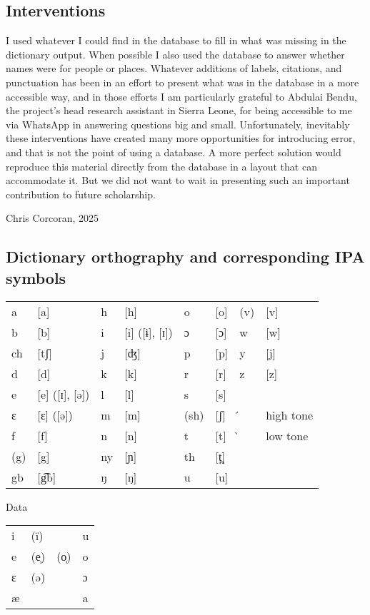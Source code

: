 \subsection{Interventions}
I used whatever I could find in the database to fill in what was missing in the dictionary output. When possible I also used the database to answer whether names were for people or places. Whatever additions of labels, citations, and punctuation has been in an effort to present what was in the database in a more accessible way, and in those efforts I am particularly grateful to Abdulai Bendu, the project’s head research assistant in Sierra Leone, for being accessible to me via WhatsApp in answering questions big and small. Unfortunately, inevitably these interventions have created many more opportunities for introducing error, and that is not the point of using a database. A more perfect solution would reproduce this material directly from the database in a layout that can accommodate it. But we did not want to wait in presenting such an important contribution to future scholarship.  




\begin{flushright}
    Chris Corcoran, 2025
\end{flushright}




\subsection{Dictionary orthography and corresponding IPA symbols}

\begin{tabularx}{\textwidth}{llllllll}
a & [a] & h & [h] & o & [o] & (v) & [v]\\
b & [b] & i & [i] ([ɨ], [ɪ]) & ɔ & [ɔ] & w & [w]\\
ch & [tʃ] & j & [ʤ] & p & [p] & y & [j]\\
d & [d] & k & [k] & r & [r] & z & [z]\\
e & [e] ([ɪ], [ə]) & l & [l] & s & [s] &  & \\
{}ɛ & [ɛ] ([ə]) & m & [m] & (sh) & [ʃ] &  ́  & high tone\\
f & [f] & n & [n] & t & [t] &  ̀  & low tone\\
(g) & [g] & ny & [ɲ] & th & [t̪] &  & \\
gb & [g͡b] & ŋ & [ŋ] & u & [u] &  & \\
\end{tabularx}
\medskip

\begin{flushleft}
\citet{Pichl1967} Data 
\end{flushleft}
\begin{tabularx}{.7\textwidth}{llll}
i & (ï) &  & u\\
e & (e̹) & (o̹) & o\\
ɛ & (ə) &  & ɔ\\
æ &  & & a\\
\end{tabularx}

